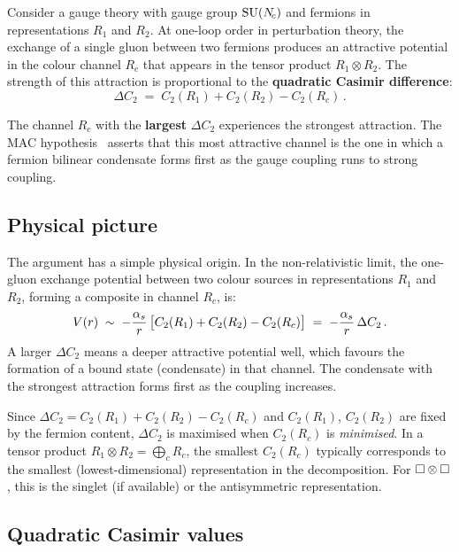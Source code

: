 \documentclass[11pt,a4paper]{article}
\begin{document}
Consider a gauge theory with gauge group $\mathrm{SU}(N_{\!c})$ and fermions in
representations $R_1$ and $R_2$.  At one-loop order in perturbation
theory, the exchange of a single gluon between two fermions produces an
attractive potential in the colour channel $R_c$ that appears in the
tensor product $R_1 \otimes R_2$.  The strength of this attraction is
proportional to the \textbf{quadratic Casimir difference}:
\begin{equation}\label{eq:DeltaC2}
  \boxed{\Delta C_2 \;=\; C_2(R_1) + C_2(R_2) - C_2(R_c)\,.}
\end{equation}

The channel $R_c$ with the \textbf{largest} $\Delta C_2$ experiences the
strongest attraction.  The MAC hypothesis~\cite{RDS1980} asserts that
this most attractive channel is the one in which a fermion bilinear
condensate forms first as the gauge coupling runs to strong coupling.

\subsection{Physical picture}

The argument has a simple physical origin.  In the non-relativistic
limit, the one-gluon exchange potential between two colour sources in
representations $R_1$ and $R_2$, forming a composite in channel $R_c$,
is:
\begin{equation}\label{eq:Voge}
  V(r) \;\sim\; -\frac{\alpha_s}{r}\,
  \bigl[C_2(R_1) + C_2(R_2) - C_2(R_c)\bigr]
  \;=\; -\frac{\alpha_s}{r}\,\Delta C_2\,.
\end{equation}
A larger $\Delta C_2$ means a deeper attractive potential well, which
favours the formation of a bound state (condensate) in that channel.
The condensate with the strongest attraction forms first as the coupling
increases.

\begin{remark}
  Since $\Delta C_2 = C_2(R_1) + C_2(R_2) - C_2(R_c)$ and $C_2(R_1)$,
  $C_2(R_2)$ are fixed by the fermion content, $\Delta C_2$ is maximised
  when $C_2(R_c)$ is \emph{minimised}.  In a tensor product
  $R_1 \otimes R_2 = \bigoplus_c R_c$, the smallest $C_2(R_c)$ typically
  corresponds to the smallest (lowest-dimensional) representation in the
  decomposition.  For $\square \otimes \square$, this is the singlet (if
  available) or the antisymmetric representation.
\end{remark}

\subsection{Quadratic Casimir values}
\end{document}
